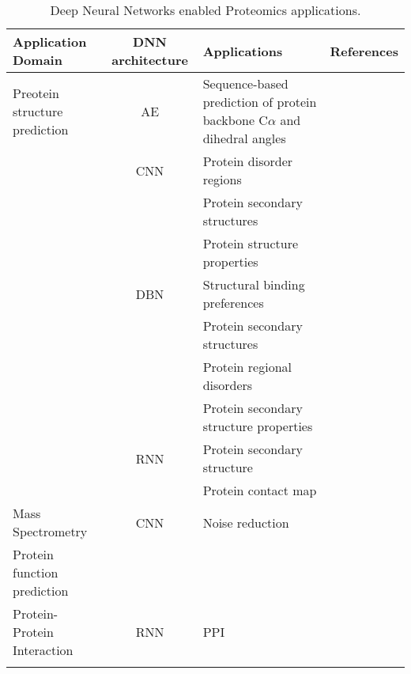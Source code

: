 \begin{table}[h!]
\centering
\begin{tabular}{|| l | c | l | l ||}
    \hline
    Application Domain & DNN architecture & Applications & References\\
    \hline \hline
    Preotein structure prediction & AE & Sequence-based prediction of protein backbone C$\alpha$ and dihedral angles & \\
    & CNN & Protein disorder regions & \\
    &     & Protein secondary structures & \\
    &     & Protein structure properties & \\
    & DBN & Structural binding preferences & \\
    &     & Protein secondary structures & \\
    &     & Protein regional disorders & \\
    &     & Protein secondary structure properties & \\
    & RNN & Protein secondary structure & \\
    &     & Protein contact map & \\
    \hline 
    Mass Spectrometry & CNN & Noise reduction & \\
    \hline 
    Protein function prediction & & \\
    \hline 
    Protein-Protein Interaction & RNN & PPI &  \\
    & &\\
    \hline \hline
\end{tabular}
\caption{Deep Neural Networks enabled Proteomics applications.}
\label{tab:PS-DNN}
\end{table}